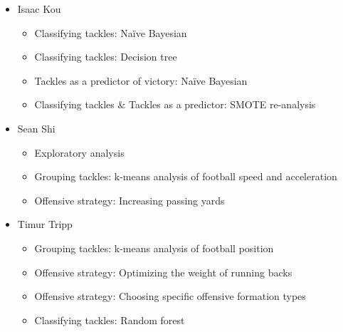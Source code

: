 \documentclass[bibtex, sigconf, hyperref={colorlinks=true,linkcolor=blue,urlcolor=blue}]{acmart}
\begin{document}
\begin{itemize}
  \item Isaac Kou
  \begin{itemize}
    \item Classifying tackles: Na\"ive Bayesian
    \item Classifying tackles: Decision tree
    \item Tackles as a predictor of victory: Na\"ive Bayesian
    \item Classifying tackles \& Tackles as a predictor: SMOTE re-analysis
  \end{itemize}
  \item Sean Shi
  \begin{itemize}
    \item Exploratory analysis
    \item Grouping tackles: k-means analysis of football speed and acceleration
    \item Offensive strategy: Increasing passing yards
  \end{itemize}
  \item Timur Tripp
  \begin{itemize}
    \item Grouping tackles: k-means analysis of football position
    \item Offensive strategy: Optimizing the weight of running backs
    \item Offensive strategy: Choosing specific offensive formation types
    \item Classifying tackles: Random forest
  \end{itemize}
\end{itemize}
\end{document}
